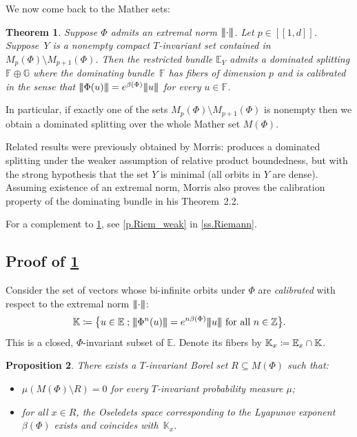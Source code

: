 \documentclass[10pt]{amsart}
\newcommand{\ldbrack}{[\![}
\newcommand{\rdbrack}{]\!]}
\def\vcentcolon{\mathrel{\mathop\ordinarycolon}}
\providecommand\ordinarycolon{:}
\providecommand*\coloneqq{\vcentcolon\mathrel{\mkern-1.2mu}=}
\theoremstyle{plain}
\newtheorem{theorem}{Theorem}[section]
\newtheorem{proposition}[theorem]{Proposition}
\theoremstyle{definition}
\newcommand{\tribar}[1]{\mathopen{| {\kern -1.5pt} | {\kern -1.5pt} |} {#1}
\mathclose{| {\kern -1.5pt} | {\kern -1.5pt} |}}
\newcommand{\ZZ}{\mathbb{Z}}
\newcommand{\EE}{\mathbb{E}}
\newcommand{\FF}{\mathbb{F}}
\newcommand{\GG}{\mathbb{G}}
\newcommand{\KK}{\mathbb{K}}
\newcommand{\st}{\;\mathord{;}\;}
\begin{document}
We now come back to the Mather sets:

\begin{theorem}\label{t.dom}
Suppose $\Phi$ admits an extremal norm $\tribar{\cdot}$.
Let $p \in \ldbrack 1, d \rdbrack$.
Suppose~$Y$ is a nonempty compact $T$-invariant set contained in $M_p(\Phi) \setminus M_{p+1}(\Phi)$.
Then the restricted bundle $\EE_Y$ admits a dominated splitting $\FF \oplus \GG$ where the dominating bundle~$\FF$ has fibers of dimension $p$ and is calibrated in the sense that $\tribar{\Phi(u)} = e^{\beta(\Phi)} \tribar{u}$ for every $u \in \FF$.
\end{theorem}

In particular, if exactly one of the sets $M_p(\Phi) \setminus M_{p+1}(\Phi)$ is nonempty then we obtain a dominated splitting over the whole Mather set $M(\Phi)$.

Related results were previously obtained by Morris: \cite[Th.\,2.1]{Morris_rapidly} produces a dominated splitting under the weaker assumption of relative product boundedness, but with the strong hypothesis that the set $Y$ is minimal (\ie all orbits in $Y$ are dense). Assuming existence of an extremal norm, Morris also proves the calibration property of the dominating bundle in his Theorem~2.2.

For a complement to \cref{t.dom}, see \cref{p.Riem_weak} in \cref{ss.Riemann}.

\subsection{Proof of \texorpdfstring{\cref{t.dom}}{the domination theorem}}

Consider the set of vectors whose bi-infinite orbits under $\Phi$ are \emph{calibrated} with respect to the extremal norm $\tribar{\mathord{\cdot}}$:
\begin{equation}\label{e.calibrated}
\KK \coloneqq \big\{ u \in \EE \st \tribar{\Phi^n(u)} = e^{n \beta(\Phi)}\tribar{u} \text{ for all } n \in \ZZ \big\}.
\end{equation}
This is a closed, $\Phi$-invariant subset of $\EE$.
Denote its fibers by $\KK_x \coloneqq \EE_x \cap \KK$.

\begin{proposition}\label{p.Oseledets}
There exists a $T$-invariant Borel set $R \subseteq M(\Phi)$ such that:
\begin{itemize}
\item $\mu ( M(\Phi) \setminus R ) = 0$ for every $T$-invariant probability measure $\mu$;
\item for all $x \in R$, the Oseledets space corresponding to the Lyapunov exponent $\beta(\Phi)$ exists and coincides with~$\KK_x$.
\end{itemize}
\end{proposition}
\end{document}
